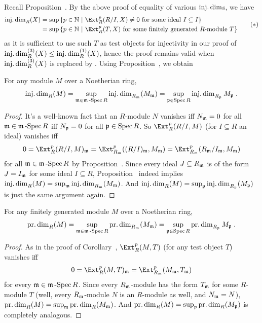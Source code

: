 \documentclass[a4paper,parskip=half,numbers=enddot, DIV=12]{scrreprt}
\begin{document}
Recall Proposition~. By the above proof of equality of various $\operatorname{inj.dim}$s, we have
\begin{align}\lbl{eq:idim}
	\begin{split}
		\idim_R(X)&=\sup\left\{p\in\IN\st\Ext_R^p(R/I,X)\neq 0\text{ for some ideal }I\subseteq I\right\}\\
		&=\sup\left\{p\in\IN\st\Ext_R^p(T,X)\text{ for some finitely generated }R\text{-module }T\right\}
	\end{split}\tag{$*$}
\end{align}
as it is sufficient to use such $T$ as test objects for injectivity in our proof of $\operatorname{inj.dim}_R^{(3)}(X)\leq \operatorname{inj.dim}_R^{(1)}(X)$, hence the proof remains valid when $\operatorname{inj.dim}_R^{(3)}(X)$ is replaced by . Using Proposition~, we obtain
\begin{cor}
	For any module $M$ over a Noetherian ring,
	\begin{align*}
		\operatorname{inj.dim}_R(M)=\sup_{\mathfrak{m}\in\mathfrak{m}\operatorname{-Spec} R}\operatorname{inj.dim}_{R_{\mathfrak{m}}}(M_{\mathfrak{m}})=\sup_{\mathfrak{p}\in\operatorname{Spec} R}\operatorname{inj.dim}_{R_{\mathfrak{p}}}M_{\mathfrak{p}}\;.
	\end{align*}
\end{cor}
\begin{proof}
	It's a well-known fact that an $R$-module $N$ vanishes iff $N_{\mathfrak{m}}=0$ for all $\mathfrak{m}\in\mathfrak{m}\operatorname{-Spec} R$ iff $N_{\mathfrak{p}}=0$ for all $\mathfrak{p}\in\operatorname{Spec} R$. So $\Ext_R^p(R/I,M)$ (for $I\subseteq R$ an ideal) vanishes iff
	\begin{align*}
		0=\Ext_R^p(R/I,M)_\mm=\Ext_{R_\mm}^p((R/I)_\mm,M_\mm)=\Ext_{R_\mm}^p(R_\mm/I_\mm,M_\mm)
	\end{align*}
	for all $\mathfrak{m}\in\mathfrak{m}\operatorname{-Spec} R$ by Proposition~. Since every ideal $J\subseteq R_{\mathfrak{m}}$ is of the form $J=I_{\mathfrak{m}}$ for some ideal $I\subseteq R$, Proposition~ indeed implies $\operatorname{inj.dim}_R(M)=\sup_{\mathfrak{m}}\operatorname{inj.dim}_{R_{\mathfrak{m}}}(M_{\mathfrak{m}})$. And $\operatorname{inj.dim}_R(M)=\sup_{\mathfrak{p}}\operatorname{inj.dim}_{R_{\mathfrak{p}}}(M_{\mathfrak{p}})$ is just the same argument again. 
\end{proof}
\begin{cor}
	For any finitely generated module $M$ over a Noetherian ring,
	\begin{align*}
	\operatorname{pr.dim}_R(M)=\sup_{\mathfrak{m}\in\mathfrak{m}\operatorname{-Spec} R}\operatorname{pr.dim}_{R_{\mathfrak{m}}}(M_{\mathfrak{m}})=\sup_{\mathfrak{p}\in\operatorname{Spec} R}\operatorname{pr.dim}_{R_{\mathfrak{p}}}M_{\mathfrak{p}}\;.
	\end{align*}
\end{cor}
\begin{proof}
	As in the proof of Corollary~, $\Ext_R^p(M,T)$ (for any test object $T$) vanishes iff
	\begin{align*}
		0=\Ext_R^p(M,T)_\mm=\Ext_{R_\mm}^p(M_\mm,T_\mm)
	\end{align*}
	for every $\mathfrak{m}\in\mathfrak{m}\operatorname{-Spec} R$. Since every $R_{\mathfrak{m}}$-module has the form $T_{\mathfrak{m}}$ for some $R$-module $T$ (well, every $R_{\mathfrak{m}}$-module $N$ is an $R$-module as well, and $N_{\mathfrak{m}}=N$), $\operatorname{pr.dim}_R(M)=\sup_{\mathfrak{m}}\operatorname{pr.dim}_R(M_{\mathfrak{m}})$. And $\operatorname{pr.dim}_R(M)=\sup_{\mathfrak{p}}\operatorname{pr.dim}_R(M_{\mathfrak{p}})$ is completely analogous.
\end{proof}
\end{document}
